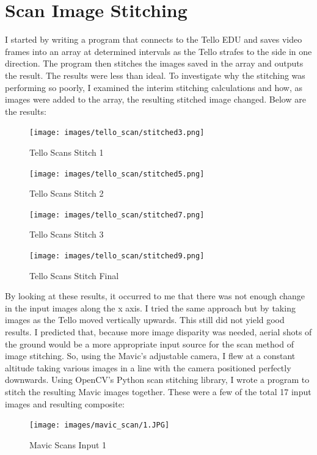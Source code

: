 \section{Scan Image Stitching}
\label{scanimagestitching}

I started by writing a program that connects to the Tello EDU and saves video frames into an array at determined intervals as the Tello strafes to the side in one direction. The program then stitches the images saved in the array and outputs the result. The results were less than ideal. To investigate why the stitching was performing so poorly, I examined the interim stitching calculations and how, as images were added to the array, the resulting stitched image changed. Below are the results: 

\begin{figure}[htbp]
\centering
\texttt{[image: images/tello\_scan/stitched3.png]}
\caption{Tello Scans Stitch 1}
\end{figure}

\begin{figure}[htbp]
\centering
\texttt{[image: images/tello\_scan/stitched5.png]}
\caption{Tello Scans Stitch 2}
\end{figure}

\begin{figure}[htbp]
\centering
\texttt{[image: images/tello\_scan/stitched7.png]}
\caption{Tello Scans Stitch 3}
\end{figure}

\begin{figure}[htbp]
\centering
\texttt{[image: images/tello\_scan/stitched9.png]}
\caption{Tello Scans Stitch Final}
\end{figure}

By looking at these results, it occurred to me that there was not enough change in the input images along the x axis. I tried the same approach but by taking images as the Tello moved vertically upwards. This still did not yield good results. I predicted that, because more image disparity was needed, aerial shots of the ground would be a more appropriate input source for the scan method of image stitching. So, using the Mavic's adjustable camera, I flew at a constant altitude taking various images in a line with the camera positioned perfectly downwards. Using OpenCV's Python scan stitching library, I wrote a program to stitch the resulting Mavic images together. These were a few of the total 17 input images and resulting composite: 

\begin{figure}[htbp]
\centering
\texttt{[image: images/mavic\_scan/1.JPG]}
\caption{Mavic Scans Input 1}
\end{figure}

